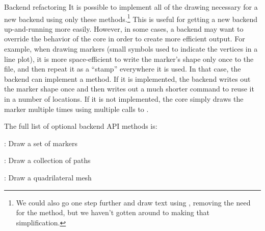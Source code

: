 \begin{aosasect1}{Backend refactoring}
It is possible to implement all of the drawing necessary for a new
backend using only these methods.\footnote{We could also go one step
  further and draw text using , removing the need for
  the  method, but we haven't gotten around to making
  that simplification.}  This is useful for getting a new backend
up-and-running more easily.  However, in some cases, a backend may
want to override the behavior of the core in order to create more
efficient output.  For example, when drawing markers (small symbols
used to indicate the vertices in a line plot), it is more
space-efficient to write the marker's shape only once to the file, and
then repeat it as a ``stamp'' everywhere it is used.  In that case,
the backend can implement a  method.  If it is
implemented, the backend writes out the marker shape once and then
writes out a much shorter command to reuse it in a number of
locations.  If it is not implemented, the core simply draws the marker
multiple times using multiple calls to .

The full list of optional backend API methods is:

\begin{aosaitemize}

  \item {}: Draw a set of markers

  \item {}: Draw a collection of paths

  \item {}: Draw a quadrilateral mesh

\end{aosaitemize}

\end{aosasect1}

